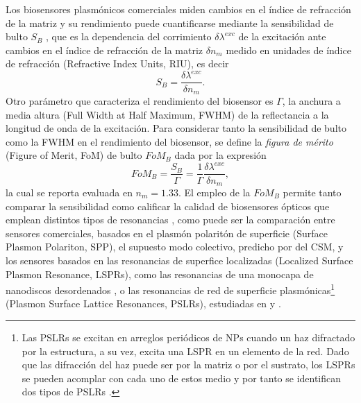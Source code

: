 Los biosensores plasmónicos comerciales miden cambios en el índice de refracción de la matriz y su rendimiento puede cuantificarse mediante la sensibilidad de bulto $S_B$ \cite{estevez2014trends,svedendahl2009refractometric}, que es la dependencia del corrimiento $\delta \lambda^{exc}$ de la excitación ante cambios en el índice de refracción de la matriz $\delta n_m$ medido en unidades de índice de refracción (Refractive Index Units, RIU), es decir
%
	\begin{equation}
	S_B = \frac{\delta \lambda^{exc}}{\delta n_m}.
	\label{eq:SBulk}
	\end{equation}
%
Otro parámetro que caracteriza el rendimiento del biosensor es $\Gamma$, la anchura a media altura (Full Width at Half Maximum, FWHM) de la reflectancia a la longitud de onda de la excitación. Para considerar tanto la sensibilidad de bulto como la FWHM en el rendimiento del biosensor, se define la \emph{figura de mérito} (Figure of Merit, FoM) de bulto  $\textit{FoM}_B$ dada por la expresión
%
	\begin{equation}
	\textit{FoM}_B = \frac{S_B}{\Gamma}
			=\frac{1}{\Gamma}\frac{\delta \lambda^{exc}}{\delta n_m},
	\label{eq:FoM}
	\end{equation}
%
la cual se reporta evaluada en $n_m=1.33$. El empleo de la $\textit{FoM}_B$ permite tanto comparar la sensibilidad como calificar la calidad de biosensores ópticos que emplean distintos tipos de resonancias \cite{danilov2018ultra,svedendahl2009refractometric}, como puede ser la comparación entre sensores comerciales, basados en el plasmón polaritón de superficie (Surface Plasmon Polariton, SPP), el supuesto modo colectivo, predicho por del CSM, y los sensores basados en las resonancias de superfice localizadas (Localized Surface Plasmon Resonance, LSPRs), como las resonancias de una monocapa de nanodiscos desordenados \cite{svedendahl2009refractometric}, o las resonancias de red de superficie plasmónicas\footnote{Las PSLRs se excitan en arreglos periódicos de NPs cuando un haz difractado por la estructura, a su vez, excita una LSPR en un elemento de la red. Dado que las difracción del haz puede ser por la matriz o por el sustrato, los LSPRs se pueden acomplar con cada uno de estos medio y por tanto se identifican dos tipos de PSLRs \cite{danilov2018ultra}.} (Plasmon Surface Lattice Resonances, PSLRs), estudiadas en \cite{kabashin2009plasmonic} y \cite{danilov2018ultra}.

